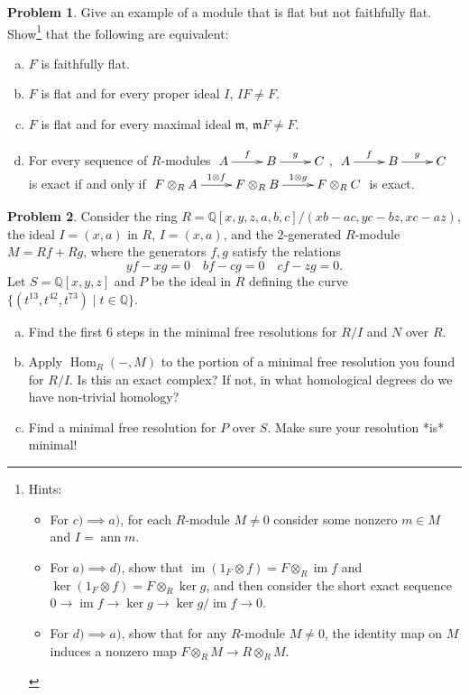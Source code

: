 \documentclass[11pt]{article}
\DeclareMathOperator{\Hom}{Hom}
\DeclareMathOperator{\im}{im}
\newcommand{\m}{\mathfrak{m}}
\DeclareMathOperator{\ann}{ann}
\theoremstyle{definition}
\newtheorem{problem}{Problem}
\begin{document}
\begin{problem} Give an example of a module that is flat but not faithfully flat. Show\footnote{Hints: \begin{itemize}
	\item For $c) \implies a)$, for each $R$-module $M \neq 0$ consider some nonzero $m \in M$ and $I = \ann m$. 
	\item For $a) \implies d)$, show that $\im(1_F \otimes f) = F \otimes_R \im f$ and $\ker(1_F \otimes f) = F \otimes_R \ker g$, and then consider the short exact sequence $0 \longrightarrow \im f \longrightarrow \ker g \longrightarrow \ker g/\im f \longrightarrow 0$. 
	\item For $d) \implies a)$, show that for any $R$-module $M \neq 0$, the identity map on $M$ induces a nonzero map $F \otimes_R M \longrightarrow R \otimes_R M$.
\end{itemize}}
 that the following are equivalent:	
\begin{enumerate}[a)]
		\item $F$ is faithfully flat.
		\item $F$ is flat and for every proper ideal $I$, $IF \neq F$.
		\item $F$ is flat and for every maximal ideal $\m$, $\m F \neq F$.
		\item For every sequence of $R$-modules $\xymatrix{A \ar[r]^-f & B \ar[r]^-g & C}$, $\xymatrix{A \ar[r]^-f & B \ar[r]^-g & C}$ is exact if and only if $\xymatrix{F \otimes_R A \ar[r]^-{1 \otimes f} & F \otimes_R B \ar[r]^-{1 \otimes g} & F \otimes_R C}$ is exact.
	\end{enumerate}
\end{problem}

\vspace{2em}

\begin{problem}
	Consider the ring $R = \mathbb{Q}[x,y,z,a,b,c]/(xb-ac,yc-bz,xc-az)$, the ideal $I = (x,a)$ in $R$, $I = (x,a)$, and the $2$-generated $R$-module $M = Rf + Rg$, where the generators $f, g$ satisfy the relations 
		$$yf-xg = 0 \quad bf - cg = 0 \quad cf - zg = 0.$$
		Let $S = \mathbb{Q}[x,y,z]$ and $P$ be the ideal in $R$ defining the curve $\lbrace (t^{13},t^{42},t^{73}) \mid t \in \mathbb{Q} \rbrace$.
		\begin{enumerate}[a)]
			\item Find the first $6$ steps in the minimal free resolutions for $R/I$ and $N$ over $R$.
			\item Apply $\Hom_R(-,M)$ to the portion of a minimal free resolution you found for $R/I$. Is this an exact complex? If not, in what homological degrees do we have non-trivial homology? 
			\item Find a minimal free resolution for $P$ over $S$. Make sure your resolution *is* minimal!
		\end{enumerate}
\end{problem}
\end{document}
